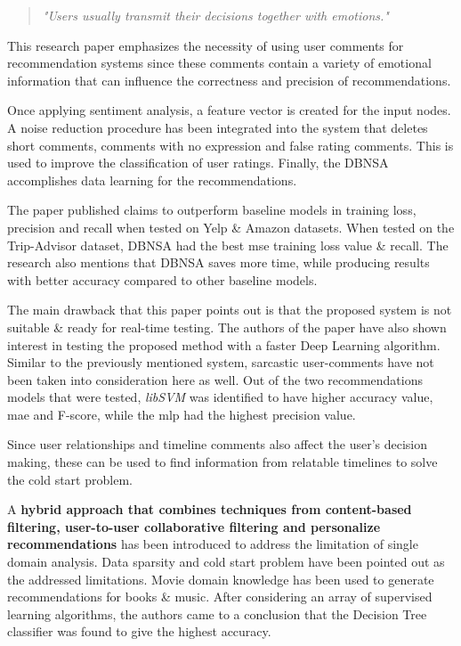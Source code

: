 \begin{quote} 
\centering 
\emph{"Users usually transmit their decisions together with emotions."} 
\\
\raggedleft
\autocite{chen_user_2019}
\end{quote}

This research paper emphasizes the necessity of using user comments for recommendation systems since these comments contain a variety of emotional information that can influence the correctness and precision of recommendations.

Once applying sentiment analysis, a feature vector is created for the input nodes. A noise reduction procedure has been integrated into the system that deletes short comments, comments with no expression and false rating comments. This is used to improve the classification of user ratings. Finally, the DBNSA accomplishes data learning for the recommendations.

The paper published claims to outperform baseline models in training loss, precision and recall when tested on Yelp \& Amazon datasets. When tested on the Trip-Advisor dataset, DBNSA had the best \gls{mse} training loss value \& recall. The research also mentions that DBNSA saves more time, while producing results with better accuracy compared to other baseline models.

The main drawback that this paper points out is that the proposed system is not suitable \& ready for real-time testing. The authors of the paper have also shown interest in testing the proposed method with a faster Deep Learning algorithm. Similar to the previously mentioned system, sarcastic user-comments have not been taken into consideration here as well.
Out of the two recommendations models that were tested, \emph{libSVM} was identified to have higher accuracy value, \gls{mae} and F-score, while the \gls{mlp} had the highest precision value.

Since user relationships and timeline comments also affect the user's decision making, these can be used to find information from relatable timelines to solve the cold start problem.

\bigbreak
A \textbf{hybrid approach that combines techniques from content-based filtering, user-to-user collaborative filtering and personalize recommendations} \autocite{ayushi_cross-domain_2018} has been introduced to address the limitation of single domain analysis. Data sparsity and cold start problem have been pointed out as the addressed limitations. Movie domain knowledge has been used to generate recommendations for books \& music. 
After considering an array of supervised learning algorithms, the authors came to a conclusion that the Decision Tree classifier was found to give the highest accuracy.

